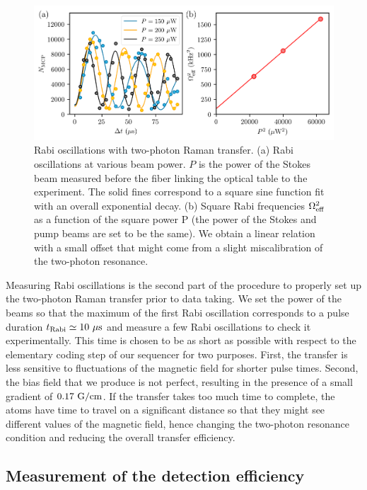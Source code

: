 \begin{figure}
    \centering
    \includegraphics[width=\textwidth]{Fig/Chapter3/rabi_flop.png}
    \caption[Rabi oscillations with two-photon Raman transfer]{Rabi oscillations with two-photon Raman transfer. (a) Rabi oscillations at various beam power. $P$ is the power of the Stokes beam measured before the fiber linking the optical table to the experiment. The solid fines correspond to a square sine function fit with an overall exponential decay. (b) Square Rabi frequencies $\Omega^2_{\rm{eff}}$ as a function of the square power P (the power of the Stokes and pump beams are set to be the same). We obtain a linear relation with a small offset that might come from a slight miscalibration of the two-photon resonance.}
    \label{fig:rabi_flop}
\end{figure}

Measuring Rabi oscillations is the second part of the procedure to properly set up the two-photon Raman transfer prior to data taking. We set the power of the beams so that the maximum of the first Rabi oscillation corresponds to a pulse duration $t_{\rm{Rabi}} \simeq 10 \ \mu \rm{s}$ and measure a few Rabi oscillations to check it experimentally. This time is chosen to be as short as possible with respect to the elementary coding step of our sequencer for two purposes. First, the transfer is less sensitive to fluctuations of the magnetic field for shorter pulse times. Second, the bias field that we produce is not perfect, resulting in the presence of a small gradient of $0.17 \ \rm{G/cm}$. If the transfer takes too much time to complete, the atoms have time to travel on a significant distance so that they might see different values of the magnetic field, hence changing the two-photon resonance condition and reducing the overall transfer efficiency.



\subsection{Measurement of the detection efficiency}

